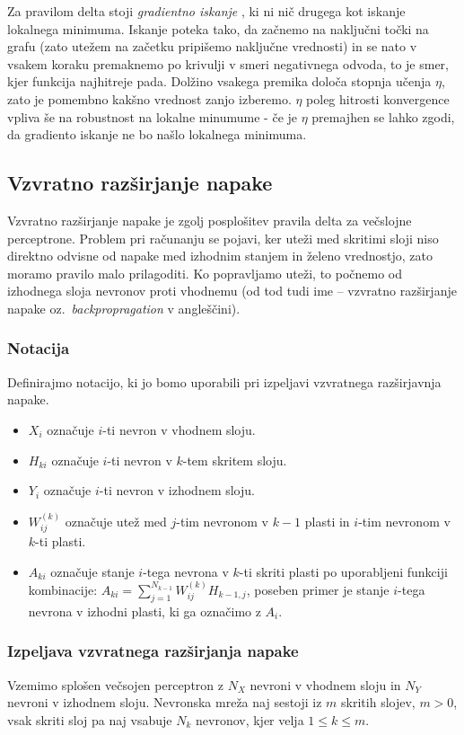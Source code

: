 \documentclass[mat1]{fmfdelo}
\begin{document}
Za pravilom delta stoji \emph{gradientno iskanje} , ki ni nič drugega kot iskanje lokalnega minimuma. Iskanje poteka tako, da začnemo na naključni točki na grafu (zato utežem na začetku pripišemo naključne vrednosti) in se nato v vsakem koraku premaknemo po krivulji v smeri negativnega odvoda, to je smer, kjer funkcija najhitreje pada. Dolžino vsakega premika določa stopnja učenja $\eta$, zato je pomembno kakšno vrednost zanjo izberemo. $\eta$ poleg hitrosti konvergence vpliva še na robustnost na lokalne
minumume - če je $\eta$ premajhen se lahko zgodi, da gradiento iskanje ne
bo našlo lokalnega minimuma.

\subsection{Vzvratno razširjanje napake}
Vzvratno razširjanje napake je zgolj posplošitev pravila delta za večslojne perceptrone. Problem pri računanju se pojavi, ker uteži med skritimi sloji niso direktno odvisne od napake med izhodnim stanjem in želeno vrednostjo, zato moramo pravilo malo prilagoditi. Ko popravljamo uteži, to počnemo od izhodnega sloja nevronov proti vhodnemu (od tod tudi ime --  vzvratno razširjanje napake oz.\ \emph{backpropragation} v angleščini). 

\subsubsection{Notacija}
Definirajmo notacijo, ki jo bomo uporabili pri izpeljavi vzvratnega razširjavnja napake. 
\begin{itemize}
\item $X_{i}$ označuje $i$-ti nevron v vhodnem sloju.
\item $H_{ki}$ označuje $i$-ti nevron v $k$-tem skritem sloju. 
\item $Y_i$ označuje $i$-ti nevron v izhodnem sloju.
\item $W^{(k)}_{ij}$ označuje utež med $j$-tim nevronom v  $k-1$ plasti in $i$-tim nevronom v $k$-ti plasti.
\item $A_{ki}$ označuje stanje $i$-tega nevrona v $k$-ti skriti plasti po uporabljeni funkciji kombinacije: $A_{ki} = \sum^{N_{k-1}}_{j=1}W^{(k)}_{ij}H_{k-1,j}$, poseben primer je stanje $i$-tega nevrona v izhodni plasti, ki ga označimo z $A_i$.
\end{itemize}

\subsubsection{Izpeljava vzvratnega razširjanja napake}
Vzemimo splošen večsojen perceptron z $N_X$ nevroni v vhodnem sloju in $N_Y$ nevroni v izhodnem sloju. Nevronska mreža naj sestoji iz $m$ skritih slojev, $m>0$, vsak skriti sloj pa naj vsabuje $N_k$ nevronov, kjer velja $1\leq k \leq m$. 
\end{document}
